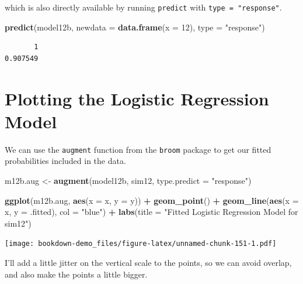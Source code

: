 \documentclass[]{book}
\newenvironment{Shaded}{\begin{snugshade}}{\end{snugshade}}
\newcommand{\KeywordTok}[1]{\textcolor[rgb]{0.13,0.29,0.53}{\textbf{#1}}}
\newcommand{\DataTypeTok}[1]{\textcolor[rgb]{0.13,0.29,0.53}{#1}}
\newcommand{\DecValTok}[1]{\textcolor[rgb]{0.00,0.00,0.81}{#1}}
\newcommand{\StringTok}[1]{\textcolor[rgb]{0.31,0.60,0.02}{#1}}
\newcommand{\OperatorTok}[1]{\textcolor[rgb]{0.81,0.36,0.00}{\textbf{#1}}}
\newcommand{\NormalTok}[1]{#1}
\theoremstyle{definition}
\theoremstyle{definition}
\theoremstyle{definition}
\theoremstyle{remark}
\begin{document}
which is also directly available by running \texttt{predict} with
\texttt{type\ =\ "response"}.

\begin{Shaded}
\begin{Highlighting}[]
\KeywordTok{predict}\NormalTok{(model12b, }\DataTypeTok{newdata =} \KeywordTok{data.frame}\NormalTok{(}\DataTypeTok{x =} \DecValTok{12}\NormalTok{), }\DataTypeTok{type =} \StringTok{"response"}\NormalTok{)}
\end{Highlighting}
\end{Shaded}

\begin{verbatim}
       1 
0.907549 
\end{verbatim}

\section{Plotting the Logistic Regression
Model}\label{plotting-the-logistic-regression-model}

We can use the \texttt{augment} function from the \texttt{broom} package
to get our fitted probabilities included in the data.

\begin{Shaded}
\begin{Highlighting}[]
\NormalTok{m12b.aug <-}\StringTok{ }\KeywordTok{augment}\NormalTok{(model12b, sim12, }\DataTypeTok{type.predict =} \StringTok{"response"}\NormalTok{)}

\KeywordTok{ggplot}\NormalTok{(m12b.aug, }\KeywordTok{aes}\NormalTok{(}\DataTypeTok{x =}\NormalTok{ x, }\DataTypeTok{y =}\NormalTok{ y)) }\OperatorTok{+}
\StringTok{    }\KeywordTok{geom_point}\NormalTok{() }\OperatorTok{+}
\StringTok{    }\KeywordTok{geom_line}\NormalTok{(}\KeywordTok{aes}\NormalTok{(}\DataTypeTok{x =}\NormalTok{ x, }\DataTypeTok{y =}\NormalTok{ .fitted), }\DataTypeTok{col =} \StringTok{"blue"}\NormalTok{) }\OperatorTok{+}
\StringTok{    }\KeywordTok{labs}\NormalTok{(}\DataTypeTok{title =} \StringTok{"Fitted Logistic Regression Model for sim12"}\NormalTok{)}
\end{Highlighting}
\end{Shaded}

\texttt{[image: bookdown-demo\_files/figure-latex/unnamed-chunk-151-1.pdf]}

I'll add a little jitter on the vertical scale to the points, so we can
avoid overlap, and also make the points a little bigger.
\end{document}

